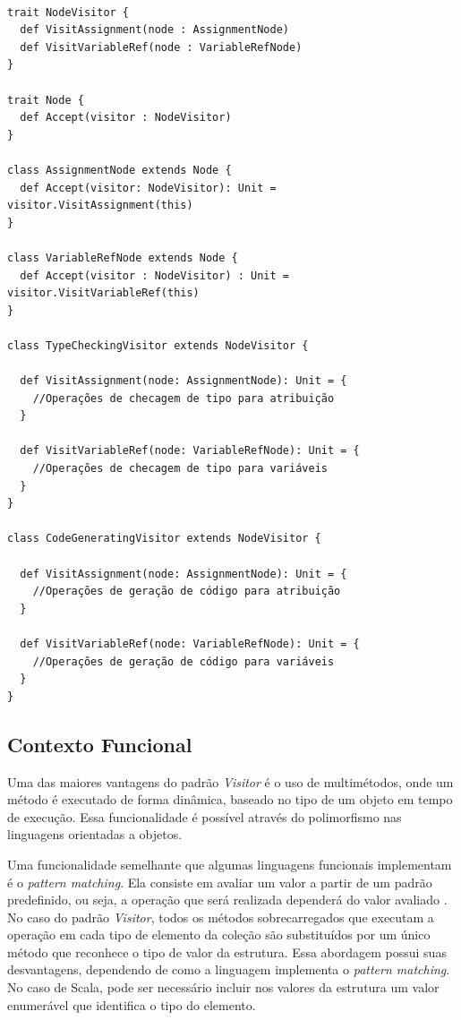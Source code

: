 \begin{lstlisting}[caption={\textit{Visitor} Orientação a Objetos.},label=oovisitor]

trait NodeVisitor {
  def VisitAssignment(node : AssignmentNode)
  def VisitVariableRef(node : VariableRefNode)
}

trait Node {
  def Accept(visitor : NodeVisitor)
}

class AssignmentNode extends Node {
  def Accept(visitor: NodeVisitor): Unit = visitor.VisitAssignment(this)
}

class VariableRefNode extends Node {
  def Accept(visitor : NodeVisitor) : Unit = visitor.VisitVariableRef(this)
}

class TypeCheckingVisitor extends NodeVisitor {

  def VisitAssignment(node: AssignmentNode): Unit = {
    //Operações de checagem de tipo para atribuição
  }

  def VisitVariableRef(node: VariableRefNode): Unit = {
    //Operações de checagem de tipo para variáveis
  }
}

class CodeGeneratingVisitor extends NodeVisitor {

  def VisitAssignment(node: AssignmentNode): Unit = {
    //Operações de geração de código para atribuição
  }

  def VisitVariableRef(node: VariableRefNode): Unit = {
    //Operações de geração de código para variáveis
  }
}

\end{lstlisting}

\subsection*{Contexto Funcional}

Uma das maiores vantagens do padrão \textit{Visitor} 
é o uso de multimétodos, onde um método é 
executado de forma dinâmica, baseado no tipo 
de um objeto em tempo de execução. Essa 
funcionalidade é possível através do polimorfismo 
nas linguagens orientadas a objetos.\cite{gamma:1995}

Uma funcionalidade semelhante que algumas 
linguagens funcionais implementam é o 
\textit{pattern matching}\cite{realworldhaskell,
functionalscala}. 
Ela consiste em avaliar um valor a partir de 
um padrão predefinido, ou seja, a operação 
que será realizada dependerá do valor avaliado
\cite{functionalscala}. 
No caso do padrão \textit{Visitor}, todos os métodos 
sobrecarregados que executam a operação 
em cada tipo de elemento da coleção são 
substituídos por um único método que 
reconhece o tipo de valor da estrutura. 
Essa abordagem possui suas desvantagens, 
dependendo de como a linguagem implementa 
o \textit{pattern matching}. No caso de Scala, 
pode ser necessário incluir nos valores da 
estrutura um valor enumerável que identifica o 
tipo do elemento. 

